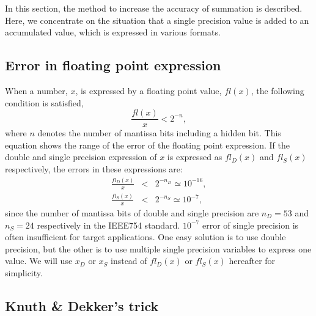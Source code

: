 In this section, the method to increase the accuracy of 
summation is described. Here, we concentrate on the situation
that a single precision value is added to an accumulated value, 
which is expressed in various formats.

\subsection{Error in floating point expression}

When a number, $x$, is expressed by a floating point value, $fl(x)$,
the following condition is satisfied,
\begin{equation}
\frac{fl(x)}{x}<2^{-n},
\end{equation}
where $n$ denotes the number of mantissa bits including a hidden bit.
This equation shows the range of the error of the floating point 
expression.
If the double and single precision expression of $x$ 
is expressed as $fl_D(x)$ and $fl_S(x)$ respectively, the errors in 
these expressions are:
\begin{eqnarray}
\frac{fl_D(x)}{x} &<& 2^{-n_D}\simeq 10^{-16},\\
\frac{fl_S(x)}{x} &<& 2^{-n_S}\simeq 10^{-7},
\end{eqnarray}
since the number of mantissa bits of double and single precision
are $n_D=53$ and $n_S=24$ respectively in the IEEE754 standard.
$10^{-7}$ error of single precision is often insufficient for 
target applications. One easy solution is to use double precision, 
but the other is to use multiple single precision variables to express 
one value. We will use $x_D$ or $x_S$ 
instead of $fl_D(x)$ or $fl_S(x)$ hereafter for simplicity.

\subsection{Knuth \& Dekker's trick}

